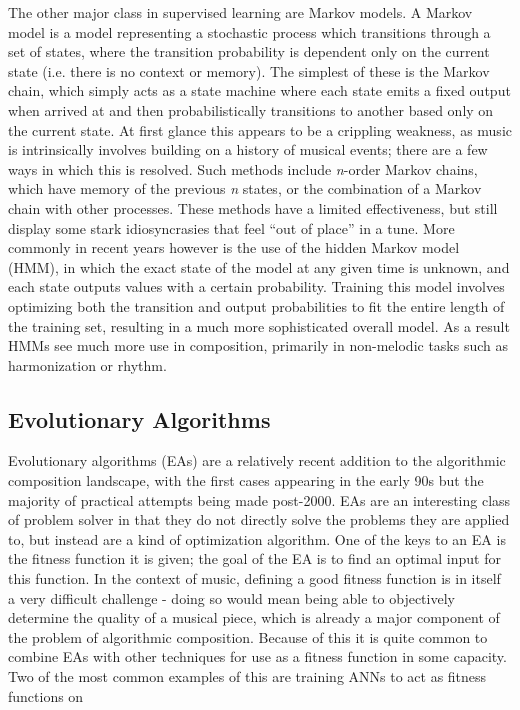 \documentclass[ author={Stephen Livermore-Tozer},
				supervisor={Dr. Peter Flach},
				degree={MEng},
				title={Performing Algorithmic Co-composition Using Machine Learning},
				subtitle={},
				type={research},
				year={2016} ]{dissertation}
\begin{document}
	The other major class in supervised learning are Markov models. A Markov model is a model representing a stochastic process which transitions through a set of states, where the transition probability is dependent only on the current state (i.e. there is no context or memory). The simplest of these is the Markov chain, which simply acts as a state machine where each state emits a fixed output when arrived at and then probabilistically transitions to another based only on the current state. At first glance this appears to be a crippling weakness, as music is intrinsically involves building on a history of musical events; there are a few ways in which this is resolved. Such methods include \textit{n}-order Markov chains, which have memory of the previous \textit{n} states, or the combination of a Markov chain with other processes. These methods have a limited effectiveness, but still display some stark idiosyncrasies that feel ``out of place'' in a tune. More commonly in recent years however is the use of the hidden Markov model (HMM), in which the exact state of the model at any given time is unknown, and each state outputs values with a certain probability. Training this model involves optimizing both the transition and output probabilities to fit the entire length of the training set, resulting in a much more sophisticated overall model. As a result HMMs see much more use in composition, primarily in non-melodic tasks such as harmonization or rhythm.
	
	\subsection{Evolutionary Algorithms}
	\label{sec:evolutionary-algorithms}
	
	Evolutionary algorithms (EAs) are a relatively recent addition to the algorithmic composition landscape, with the first cases appearing in the early 90s but the majority of practical attempts being made post-2000. EAs are an interesting class of problem solver in that they do not directly solve the problems they are applied to, but instead are a kind of optimization algorithm. One of the keys to an EA is the fitness function it is given; the goal of the EA is to find an optimal input for this function. In the context of music, defining a good fitness function is in itself a very difficult challenge - doing so would mean being able to objectively determine the quality of a musical piece, which is already a major component of the problem of algorithmic composition. Because of this it is quite common to combine EAs with other techniques for use as a fitness function in some capacity. Two of the most common examples of this are training ANNs to act as fitness functions on 
	
\end{document}
